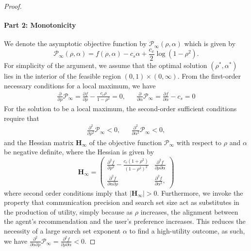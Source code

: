 \documentclass[10pt,a4paper]{amsart}
\begin{document}
\begin{proof}
\paragraph{Part 2: Monotonicity}
We denote the asymptotic objective function by $\mathcal{P}_\infty(\rho, \alpha)$ which is given by
\begin{equation*}
    \mathcal{P}_\infty(\rho, \alpha) = f(\rho, \alpha) - c_s \alpha + \frac{c_c}{2} \log(1-\rho^2).
\end{equation*}
For simplicity of the argument, we assume that the optimal solution $(\rho^*, \alpha^*)$ lies in the interior of the feasible region $(0, 1) \times (0, \infty)$. From the first-order necessary conditions for a local maximum, we have
\begin{align}
\label{eq:foc}
    \frac{\partial}{\partial \rho} \mathcal{P}_\infty = \frac{\partial f}{\partial \rho} - \frac{c_c \rho}{1-\rho^2} = 0, && \frac{\partial}{\partial \alpha} \mathcal{P}_\infty = \frac{\partial f}{\partial \alpha} - c_s = 0
\end{align}
For the solution to be a local maximum, the second-order sufficient conditions require that
\begin{align*}
    \frac{\partial^2}{\partial \rho^2} \mathcal{P}_\infty <0, && \frac{\partial^2}{\partial \alpha^2} \mathcal{P}_\infty <0,
\end{align*}
and the Hessian matrix $\mathbf{H}_\infty$ of the objective function $\mathcal{P}_\infty$ with respect to $\rho$ and $\alpha$ be negative definite, where the Hessian is given by
\begin{equation*}
    \mathbf{H}_\infty
    = \begin{pmatrix}
        \frac{\partial^2 f}{\partial \rho^2} - \frac{c_c(1+\rho^2)}{(1-\rho^2)^2} & \frac{\partial^2 f}{\partial \rho \partial \alpha} \\
        \frac{\partial^2 f}{\partial \alpha \partial \rho} & \frac{\partial^2 f}{\partial \alpha^2},
    \end{pmatrix}
\end{equation*}
where second order conditions imply that $|\mathbf{H}_\infty | > 0$. Furthermore, we invoke the property that communication precision and search set size act as substitutes in the production of utility, simply because as $\rho$ increases, the alignment between the agent's recommendation and the user's preference increases. This reduces the necessity of a large search set exponent $\alpha$ to find a high-utility outcome, as such, we have $\frac{\partial^2}{\partial \alpha \partial \rho } \mathcal{P}_\infty = \frac{\partial^2 f}{\partial \rho \partial \alpha} < 0$.


\end{proof}
\end{document}
